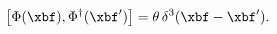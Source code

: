 \begin{equation}
\left[\Phi(\xbf),\Phi^\dagger(\xbf')\right]=\theta \,\delta^3(\xbf-\xbf').
\label{theta}
\end{equation}

